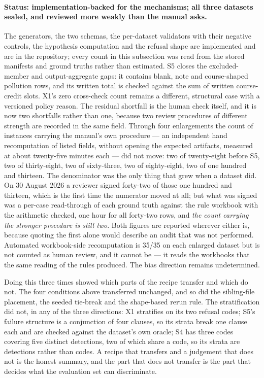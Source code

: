 \paragraph{Status: implementation-backed for the mechanisms; all three datasets sealed, and
reviewed more weakly than the manual asks.}
The generators, the two schemas, the per-dataset validators with their negative controls, the
hypothesis computation and the refusal shape are implemented and are in the repository; every
count in this subsection was read from the stored manifests and ground truths rather than
estimated. S5 closes the excluded-member and output-aggregate gaps: it contains blank, note and
course-shaped pollution rows, and its written total is checked against the sum of written
course-credit slots. X1's zero cross-check count remains a different, structural case with a
versioned policy reason. The residual shortfall is the human check itself, and it is now two
shortfalls rather than one, because two review procedures of different strength are recorded
in the same field. Through four enlargements the count of instances carrying the manual's own
procedure --- an independent hand recomputation of listed fields, without opening the expected
artifacts, measured at about twenty-five minutes each --- did not move: two of twenty-eight
before S5, two of thirty-eight, two of sixty-three, two of eighty-eight, two of one hundred
and thirteen. The denominator was the only thing that grew when a dataset did. On 30 August
2026 a reviewer signed forty-two of those one hundred and thirteen, which is the first time
the numerator moved at all; but what was signed was a per-case read-through of each ground
truth against the rule workbook with the arithmetic checked, one hour for all forty-two rows,
and \emph{the count carrying the stronger procedure is still two}. Both figures are reported
wherever either is, because quoting the first alone would describe an audit that was not
performed. Automated workbook-side recomputation is 35/35 on each enlarged dataset but is not
counted as human review, and it cannot be --- it reads the workbooks that the same reading of
the rules produced. The bias direction remains undetermined.

Doing this three times showed which parts of the recipe transfer and which do not. The four
conditions above transferred unchanged, and so did the sibling-file placement, the seeded
tie-break and the shape-based rerun rule. The stratification did not, in any of the three
directions: X1 stratifies on its two refusal codes; S5's failure structure is a conjunction
of four clauses, so its strata break one clause each and are checked against the dataset's
own oracle; S4 has three codes covering five distinct detections, two of which share a code,
so its strata are detections rather than codes. A recipe that transfers and a judgement that
does not is the honest summary, and the part that does not transfer is the part that decides
what the evaluation set can discriminate.

